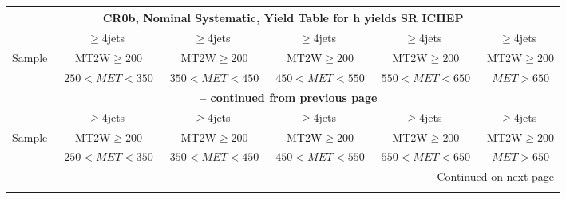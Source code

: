 \documentclass{article}
\begin{document}
 
 
 
 
\pagebreak 

 
 
 
 
\begin{longtable}{|l|c|c|c|c|c|} 
 
\multicolumn{6}{c}{ CR0b, Nominal Systematic, Yield Table for h yields SR ICHEP }\\* \hline 
  & $\ge$4jets  & $\ge$4jets  & $\ge$4jets  & $\ge$4jets  & $\ge$4jets \\* 
Sample  & ~MT2W$\ge200$  & ~MT2W$\ge200$  & ~MT2W$\ge200$  & ~MT2W$\ge200$  & ~MT2W$\ge200$ \\* 
  & ~$250<MET<350$  & ~$350<MET<450$  & ~$450<MET<550$  & ~$550<MET<650$  & ~$MET>650$ \\* 
\hline \hline 
\endfirsthead 
 
\multicolumn{6}{c}{{\bfseries \tablename\ \thetable{} -- continued from previous page}}\\* \hline 
  & $\ge$4jets  & $\ge$4jets  & $\ge$4jets  & $\ge$4jets  & $\ge$4jets \\* 
Sample  & ~MT2W$\ge200$  & ~MT2W$\ge200$  & ~MT2W$\ge200$  & ~MT2W$\ge200$  & ~MT2W$\ge200$ \\* 
  & ~$250<MET<350$  & ~$350<MET<450$  & ~$450<MET<550$  & ~$550<MET<650$  & ~$MET>650$ \\* 
\hline \hline 
\endhead 
 
\multicolumn{6}{|r|}{{Continued on next page}}\\* \hline 
\endfoot 
 
 
\endlastfoot 
 

\end{longtable}
\end{document}
